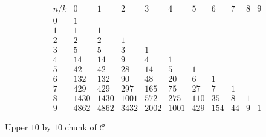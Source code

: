 
\begin{table}
    \begin{displaymath} 
        \begin{array}{c|cccccccccc}
        n/k & 0 & 1 & 2 & 3 & 4 & 5 & 6 & 7 & 8 & 9\\
        \hline
        0 & 1 &  &  &  &  &  &  &  &  &  \\
        1 & 1 & 1 &  &  &  &  &  &  &  &  \\
        2 & 2 & 2 & 1 &  &  &  &  &  &  &  \\
        3 & 5 & 5 & 3 & 1 &  &  &  &  &  &  \\
        4 & 14 & 14 & 9 & 4 & 1 &  &  &  &  &  \\
        5 & 42 & 42 & 28 & 14 & 5 & 1 &  &  &  &  \\
        6 & 132 & 132 & 90 & 48 & 20 & 6 & 1 &  &  &  \\
        7 & 429 & 429 & 297 & 165 & 75 & 27 & 7 & 1 &  &  \\
        8 & 1430 & 1430 & 1001 & 572 & 275 & 110 & 35 & 8 & 1 &  \\
        9 & 4862 & 4862 & 3432 & 2002 & 1001 & 429 & 154 & 44 & 9 & 1
        \end{array}
        \iffalse
        \quad
        \mathcal{C}_{10}^{-1}\left(\begin{array}{rrrrrrrrrr}
        1 &  &  &  &  &  &  &  &  &  \\
        1 &  &  &  &  &  &  &  &  &  \\
         & 1 &  &  &  &  &  &  &  &  \\
         & -1 & 1 &  &  &  &  &  &  &  \\
         &  & -2 & 1 &  &  &  &  &  &  \\
         &  & 1 & -3 & 1 &  &  &  &  &  \\
         &  &  & 3 & -4 & 1 &  &  &  &  \\
         &  &  & -1 & 6 & -5 & 1 &  &  &  \\
         &  &  &  & -4 & 10 & -6 & 1 &  &  \\
         &  &  &  & 1 & -10 & 15 & -7 & 1 & 
        \end{array}\right)
        \fi
    \end{displaymath}

  \caption[$\mathcal{C}$ and $\mathcal{C}^{-1}$]{Upper $10$ by $10$ chunk of $\mathcal{C}$}

  \label{tab:catalan:array} 

\end{table}
